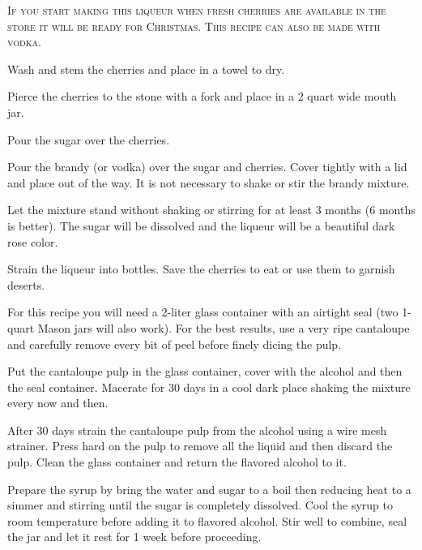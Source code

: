 \documentclass[letterpaper]{recipePMG}
\begin{document}

\textsc{If you start making this liqueur when fresh cherries are
available in the store it will be ready for Christmas.  This
recipe can also be made with vodka.}

Wash and stem the cherries and place in a towel to dry.

Pierce the cherries to the stone with a fork and place in a 2
quart wide mouth jar.

Pour the sugar over the cherries.

Pour the brandy (or vodka) over the sugar and cherries.  Cover
tightly with a lid and place out of the way.  It is not necessary
to shake or stir the brandy mixture.

Let the mixture stand without shaking or stirring for at least
3 months (6 months is better).  The sugar will be dissolved and
the liqueur will be a beautiful dark rose color.

Strain the liqueur into  bottles. Save the cherries to eat or use them
to garnish deserts.

\newpage

\label{CantaloupeLiqueur}


For this recipe you will need a 2-liter glass container with an airtight seal (two 1-quart Mason jars will also work). For the best results, use a very ripe cantaloupe and carefully remove every bit of peel before finely dicing the pulp.

Put the cantaloupe pulp in the glass container, cover with the alcohol and then the seal container. Macerate for 30 days in a cool dark place shaking the mixture every now and then.

After 30 days strain the cantaloupe pulp from the alcohol using a wire mesh strainer.  Press hard on the pulp to remove all the liquid and then discard the pulp. Clean the glass container and return the flavored alcohol to it. 

Prepare the syrup by bring the water and sugar to a boil then reducing heat to a simmer and stirring until the sugar is completely dissolved. Cool the syrup to room temperature before adding it to flavored alcohol. Stir well to combine, seal the jar and let it rest for 1 week before proceeding.
\end{document}
